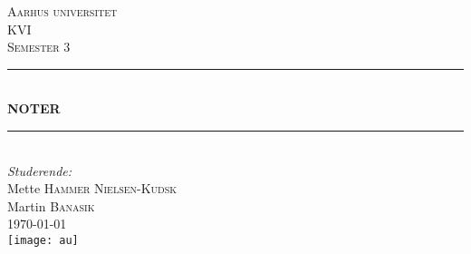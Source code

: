 \documentclass[12pt, letterpaper]{article}
\begin{document}
\begin{titlepage}

\newcommand{\HRule}{\rule{\linewidth}{0.5mm}} %

\center %
 

\textsc{\LARGE Aarhus universitet}\\[1.5cm] %
\textsc{\Large KVI}\\[0.5cm] %
\textsc{\large Semester 3}\\[0.5cm] %


\HRule \\[0.4cm]
{ \huge \bfseries NOTER}\\[0.4cm] %
\HRule \\[1.5cm]
 

\Large \emph{Studerende:}\\[1cm]
Mette \textsc{Hammer Nielsen-Kudsk}\\[0,5cm] %
Martin \textsc{Banasik}\\[1cm] %

{\large \today}\\[1,2cm] %


\texttt{[image: au]}\\ %
 

\vfill %


\end{titlepage}
\newpage
\end{document}
